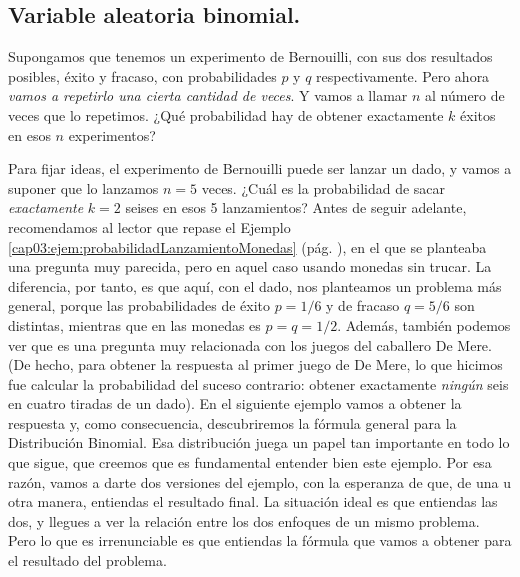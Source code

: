\subsection{Variable aleatoria binomial.}
\label{cap05:subsec:VariableAleatoriaBinomial}

Supongamos que tenemos un experimento de Bernouilli, con sus dos resultados posibles, éxito y fracaso, con probabilidades $p$ y $q$ respectivamente. Pero ahora {\em vamos a repetirlo una cierta cantidad de veces}. Y vamos a llamar $n$ al número de veces que lo repetimos. ¿Qué probabilidad hay de obtener exactamente $k$ éxitos en esos $n$ experimentos?

Para fijar ideas, el experimento de Bernouilli puede ser lanzar un dado, y vamos a suponer que lo lanzamos $n=5$ veces. ¿Cuál es la probabilidad de sacar {\em exactamente} $k=2$ seises en esos 5 lanzamientos? Antes de seguir adelante, recomendamos al lector que repase el Ejemplo \ref{cap03:ejem:probabilidadLanzamientoMonedas} (pág. \pageref{cap03:ejem:probabilidadLanzamientoMonedas}), en el que se planteaba una pregunta muy parecida, pero en aquel caso usando monedas sin trucar. La diferencia, por tanto, es que aquí, con el dado, nos planteamos un problema más general, porque las probabilidades de éxito $p=1/6$ y de fracaso $q=5/6$ son distintas, mientras que en las monedas es $p=q=1/2$. Además, también podemos ver que es una pregunta muy relacionada con los juegos del caballero De Mere. (De hecho, para obtener la respuesta al primer juego de De Mere, lo que hicimos fue calcular la probabilidad del suceso contrario: obtener exactamente {\em ningún} seis en cuatro tiradas de un dado). En el siguiente ejemplo vamos a obtener la respuesta y, como consecuencia, descubriremos la fórmula general para la Distribución Binomial. Esa distribución juega un papel tan importante en todo lo que sigue, que creemos que es fundamental entender bien este ejemplo. Por esa razón, vamos a darte dos versiones del ejemplo, con la esperanza de que, de una u otra manera, entiendas el resultado final. La situación ideal es que entiendas las dos, y llegues a ver la relación entre los dos enfoques de un mismo problema. Pero lo que es irrenunciable es que entiendas la fórmula que vamos a obtener para el resultado del problema.

